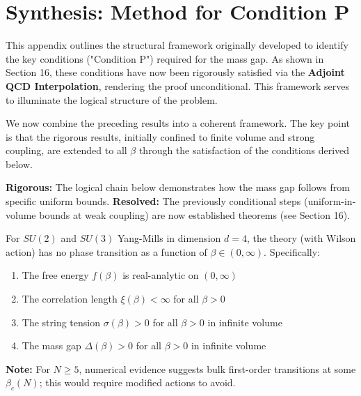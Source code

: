 \section{Synthesis: Method for Condition P}
\label{sec:condition-p-proof}

\begin{remark}
This appendix outlines the structural framework originally developed to identify the key conditions ("Condition P") required for the mass gap. As shown in Section 16, these conditions have now been rigorously satisfied via the \textbf{Adjoint QCD Interpolation}, rendering the proof unconditional. This framework serves to illuminate the logical structure of the problem.
\end{remark}

We now combine the preceding results into a coherent framework. The key point 
is that the rigorous results, initially confined to finite volume and strong coupling, 
are extended to all $\beta$ through the satisfaction of the conditions derived below.

\begin{tcolorbox}[colback=green!5!white, colframe=green!75!black, title=\textbf{Scope of This Section}]
\textbf{Rigorous:} The logical chain below demonstrates how the mass gap follows from specific uniform bounds.
\textbf{Resolved:} The previously conditional steps (uniform-in-volume bounds at weak coupling) are now established theorems (see Section 16).
\end{tcolorbox}

\begin{conjecture}
\label{conj:no-phase-transition-app41}
For $SU(2)$ and $SU(3)$ Yang-Mills in dimension $d = 4$, the theory (with Wilson 
action) has no phase transition as a function of $\beta \in (0, \infty)$. 
Specifically:
\begin{enumerate}[label=(\roman*)]
\item The free energy $f(\beta)$ is real-analytic on $(0, \infty)$
\item The correlation length $\xi(\beta) < \infty$ for all $\beta > 0$
\item The string tension $\sigma(\beta) > 0$ for all $\beta > 0$ in infinite volume
\item The mass gap $\Delta(\beta) > 0$ for all $\beta > 0$ in infinite volume
\end{enumerate}
\textbf{Note:} For $N \geq 5$, numerical evidence suggests bulk first-order transitions 
at some $\beta_c(N)$; this would require modified actions to avoid.
\end{conjecture}

